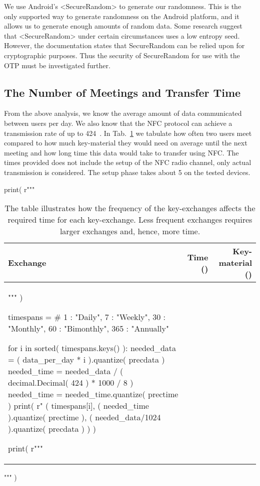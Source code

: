We use Android's <SecureRandom> to generate our randomness.
This is the only supported way to generate randomness on the Android platform, 
and it allows us to generate enough amounts of random data.
Some research \cite{AndroidLowEntropyMyth,JavaRandomness} suggest that 
<SecureRandom> under certain circumstances uses a low entropy seed.
However, the documentation states that SecureRandom can be relied upon for 
cryptographic purposes.
Thus the security of SecureRandom for use with the \ac{OTP} must be 
investigated further.

\subsection{The Number of Meetings and Transfer Time}
\label{sec:Meetings}
From the above analysis, we know the average amount of data communicated 
between users per day.
We also know that the \ac{NFC} protocol can achieve a transmission rate of up 
to \unit{424}{\kilo\bit\per\second}~\cite{NFCController}.
In Tab.~\ref{tbl:MeetingsTradeoff} we tabulate how often two users meet 
compared to how much key-material they would need on average until the next 
meeting and how long time this data would take to transfer using \ac{NFC}.
The times provided does not include the setup of the \ac{NFC} radio channel, 
only actual transmission is considered. The setup phase takes about 
\unit{5}{\second} on the tested devices.

\begin{table}
  \centering
  \caption{%
    The table illustrates how the frequency of the key-exchanges affects the 
    required time for each key-exchange.
    Less frequent exchanges requires larger exchanges and, hence, more time.
  }
  \label{tbl:MeetingsTradeoff}
  \begin{pycode}[random]
print( r"""
\begin{tabular}{lrr}
  Exchange &
  Time (\second) &
  Key-material (\kibi\byte) \\
  \toprule
""" )

timespans = {#
  1 : "Daily",
  7 : "Weekly",
  30 : "Monthly",
  60 : "Bimonthly",
  365 : "Annually"
}

for i in sorted( timespans.keys() ):
  needed_data = ( data_per_day * i ).quantize( precdata )
  needed_time = needed_data / ( decimal.Decimal( 424 ) * 1000 / 8 )
  needed_time = needed_time.quantize( prectime )
  print( r"%
  ( timespans[i],
    ( needed_time ).quantize( prectime ),
    ( needed_data/1024 ).quantize( precdata )
    ) )

print( r"""
  \bottomrule
\end{tabular}
""" )
  \end{pycode}
\end{table}

